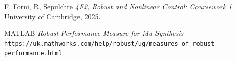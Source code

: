 \documentclass{article}
\begin{document}
\begin{thebibliography}{9}

    
      F. Forni, R, Sepulchre
      \emph{4F2, Robust and Nonlinear Control: Coursework 1}
      University of Cambridge,
      2025.
    
      MATLAB
      \emph{Robust Performance Measure for Mu Synthesis}
      \texttt{https://uk.mathworks.com/help/robust/ug/measures-of-robust-performance.html}

    
\end{thebibliography}
\end{document}
